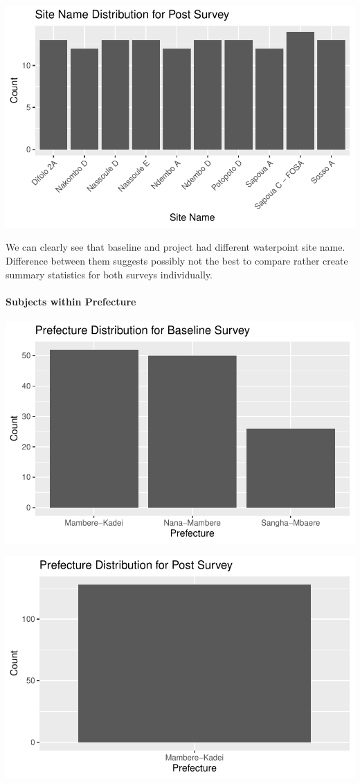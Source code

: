 \documentclass[
  letterpaper,
  DIV=11,
  numbers=noendperiod]{scrartcl}
\let\oldparagraph\paragraph
\renewcommand{\paragraph}[1]{\oldparagraph{#1}\mbox{}}
\begin{document}
\includegraphics{report_files/figure-pdf/unnamed-chunk-27-1.pdf}

We can clearly see that baseline and project had different waterpoint
site name. Difference between them suggests possibly not the best to
compare rather create summary statistics for both surveys individually.

\hypertarget{subjects-within-prefecture}{%
\paragraph{Subjects within
Prefecture}\label{subjects-within-prefecture}}

\includegraphics{report_files/figure-pdf/unnamed-chunk-28-1.pdf}

\includegraphics{report_files/figure-pdf/unnamed-chunk-29-1.pdf}
\end{document}

